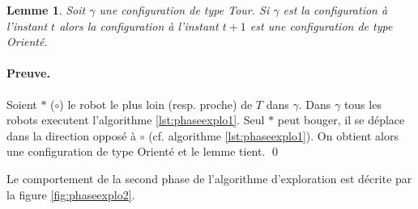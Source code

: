 \documentclass{article}
\newtheorem{lemme}{Lemme}
\begin{document}
      \begin{lemme}
        Soit $\gamma$ une configuration de type Tour. Si $\gamma$ est la
        configuration à l'instant $t$ alors la configuration à l'instant $t + 1$
        est une configuration de type Orienté.
      \end{lemme}
      
      \paragraph{Preuve.} Soient $\ast$ ($\circ$) le robot le plus loin
        (resp. proche) de $T$ dans $\gamma$. Dans $\gamma$ tous les robots 
        executent l'algorithme \ref{lst:phaseexplo1}. Seul $\ast$ peut bouger,
        il se déplace dans la direction opposé à $\circ$ (cf. algorithme
        \ref{lst:phaseexplo1}). On obtient alors une configuration de type
        Orienté et le lemme tient. \qed \medskip

      Le comportement de la second phase de l'algorithme d'exploration est
      décrite par la figure \ref{fig:phaseexplo2}.
\end{document}
